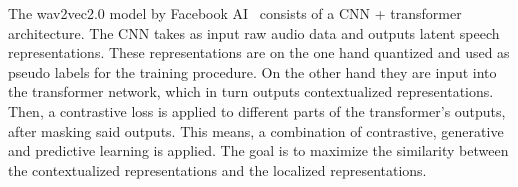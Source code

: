 The wav2vec2.0 model by Facebook AI~\cite{wav2vec20} consists of a CNN + transformer architecture. The CNN takes as input raw audio data and outputs latent speech representations. These representations are on the one hand quantized and used as pseudo labels for the training procedure. On the other hand they are input into the transformer network, which in turn outputs contextualized representations. Then, a contrastive loss is applied to different parts of the transformer's outputs, after masking said outputs. This means, a combination of contrastive, generative and predictive learning is applied. The goal is to maximize the similarity between the contextualized representations and the localized representations.